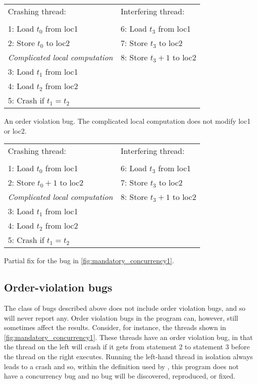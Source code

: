 \begin{sanefig}
{\hfill}
\begin{tabular}{p{8cm}l}
Crashing thread:\hfill         & Interfering thread: \\
\\
1: Load $t_0$ from loc1        & 6: Load $t_3$ from loc1 \\
2: Store $t_0$ to loc2         & 7: Store $t_3$ to loc2 \\
\textit{Complicated local computation} & 8: Store $t_3 + 1$ to loc2 \\
3: Load $t_1$ from loc1        & \\
4: Load $t_2$ from loc2        & \\
5: Crash if $t_1 = t_2$ & \\
\end{tabular}
{\hfill}
\caption{An order violation bug. The complicated local computation
  does not modify loc1 or loc2.}
\label{fig:mandatory_concurrency1}
\end{sanefig}

\begin{sanefig}
\begin{centering}
\hfill
\begin{tabular}{p{8cm}l}
Crashing thread:          & Interfering thread: \\
\\
1: Load $t_0$ from loc1        & 6: Load $t_3$ from loc1 \\
2: Store $t_0+1$ to loc2       & 7: Store $t_3$ to loc2 \\
\textit{Complicated local computation} & 8: Store $t_3 + 1$ to loc2 \\
3: Load $t_1$ from loc1        & \\
4: Load $t_2$ from loc2        & \\
5: Crash if $t_1 = t_2$ & \\
\end{tabular}
\hfill
\end{centering}
\caption{Partial fix for the bug in
  \autoref{fig:mandatory_concurrency1}.}
\label{fig:mandatory_concurrency2}
\end{sanefig}

\subsection{Order-violation bugs}
The class of bugs described above does not include order violation
bugs, and so {\technique} will never report any.  Order violation bugs
in the program can, however, still sometimes affect the results.
Consider, for instance, the threads shown in
\autoref{fig:mandatory_concurrency1}.  These threads have an order
violation bug, in that the thread on the left will crash if it gets
from statement 2 to statement 3 before the thread on the right
executes.  Running the left-hand thread in isolation always leads to a
crash and so, within the definition used by {\technique}, this program
does not have a concurrency bug and no bug will be discovered,
reproduced, or fixed.

